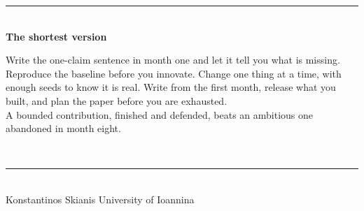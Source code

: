 \documentclass[aspectratio=169,11pt]{beamer}
\begin{document}
\begin{frame}
\vfill
\centering
{\color{brandlight}\rule{0.8\textwidth}{1.4pt}}\\[10pt]
{\large\bfseries\color{brand}The shortest version}\\[10pt]
\begin{minipage}{0.82\textwidth}\centering
Write the one-claim sentence in month one and let it tell you what is missing.
Reproduce the baseline before you innovate. Change one thing at a time, with
enough seeds to know it is real. Write from the first month, release what you
built, and plan the paper before you are exhausted.\\[6pt]
A bounded contribution, finished and defended, beats an ambitious one
abandoned in month eight.
\end{minipage}\\[12pt]
{\color{brandlight}\rule{0.8\textwidth}{1.4pt}}\\[14pt]
{\footnotesize\color{mutegray}Konstantinos Skianis \quad\textbullet\quad
University of Ioannina \quad\textbullet\quad
{}}
\vfill
\end{frame}
\end{document}
